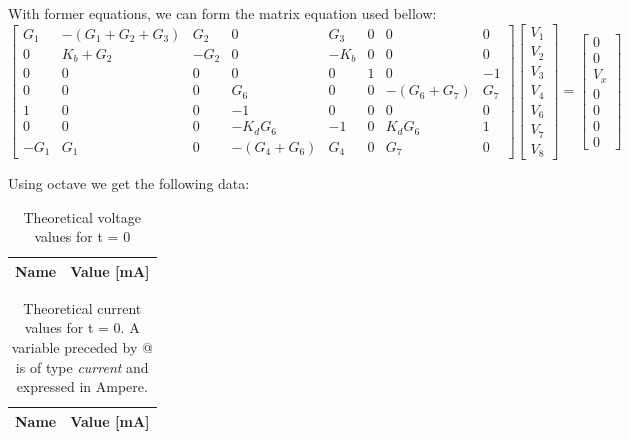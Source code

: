 With former equations, we can form the matrix equation used bellow:
\begin{equation*}
	\begin{bmatrix}
		G_1 & -(G_1 + G_2 + G_3) & G_2 & 0 & G_3 & 0 & 0 & 0 \\ 
		0 & K_b + G_2 & -G_2 & 0 & -K_b & 0 & 0 & 0 \\
		0 & 0 & 0 & 0 & 0 & 1 & 0 & -1 \\ 
		0 & 0 & 0 & G_6 & 0 & 0 & -(G_6 + G_7) & G_7 \\
		1 & 0 & 0 & -1 & 0 & 0 & 0 & 0 \\
		0 & 0 & 0 & -K_dG_6 & -1 & 0 & K_dG_6 & 1 \\
		-G_1 & G_1 & 0 & -(G_4 + G_6) & G_4 & 0 & G_7 & 0
	\end{bmatrix}
	\begin{bmatrix} V_1 \\ V_2 \\ V_3 \\ V_4 \\ V_6 \\ V_7 \\ V_8 
	\end{bmatrix}
	=
	\begin{bmatrix} 0 \\ 0 \\ V_x \\ 0 \\ 0 \\ 0 \\ 0 
	\end{bmatrix}
\end{equation*}

Using octave we get the following data:
\begin{table}[h!]
	\centering
	\begin{tabular}{|l|r|}
		\hline    
		{\bf Name} & {\bf Value [mA]} \\ \hline
		
	\end{tabular}
	\caption{Theoretical voltage values for t = 0}
	\label{tab:op}
\end{table}

\begin{table}[h!]
	\centering
	\begin{tabular}{|l|r|}
		\hline    
		{\bf Name} & {\bf Value [mA]} \\ \hline
		
	\end{tabular}
	\caption{Theoretical current values for t = 0. A variable preceded by @ is of type {\em current}
		and expressed in Ampere.}
	\label{tab:op}
\end{table}


